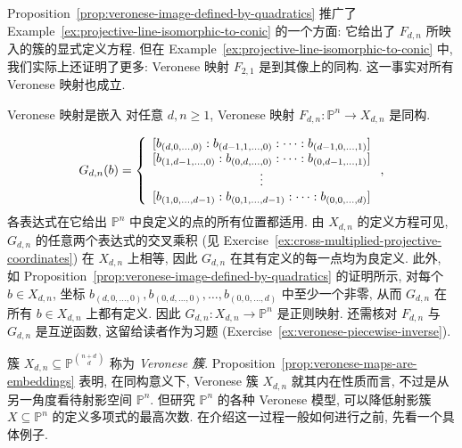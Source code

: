 Proposition~\ref{prop:veronese-image-defined-by-quadratics} 推广了 Example~\ref{ex:projective-line-isomorphic-to-conic} 的一个方面: 它给出了 $F_{d,n}$ 所映入的簇的显式定义方程. 但在 Example~\ref{ex:projective-line-isomorphic-to-conic} 中, 我们实际上还证明了更多: Veronese 映射 $F_{2,1}$ 是到其像上的同构. 这一事实对所有 Veronese 映射也成立.

\begin{Proposition}{Veronese 映射是嵌入}\leavevmode\label{prop:veronese-maps-are-embeddings}
对任意 $d,n\ge1$, Veronese 映射 $F_{d,n}:\mathbb{P}^{n}\to X_{d,n}$ 是同构.
\end{Proposition}
\begin{Proof}
\[
  G_{d,n}(b)=\left\{\begin{array}{l}
  [b_{(d,0,\ldots,0)}:b_{(d-1,1,\ldots,0)}:\cdots:b_{(d-1,0,\ldots,1)}]\\
  {[b_{(1,d-1,\ldots,0)}:b_{(0,d,\ldots,0)}:\cdots:b_{(0,d-1,\ldots,1)}]}\\
  \multicolumn{1}{c}{\vdots}\\
  {[b_{(1,0,\ldots,d-1)}:b_{(0,1,\ldots,d-1)}:\cdots:b_{(0,0,\ldots,d)}]}
  \end{array}\right.,
\]
各表达式在它给出 $\mathbb{P}^{n}$ 中良定义的点的所有位置都适用. 由 $X_{d,n}$ 的定义方程可见, $G_{d,n}$ 的任意两个表达式的交叉乘积 (见 Exercise~\ref{ex:cross-multiplied-projective-coordinates}) 在 $X_{d,n}$ 上相等, 因此 $G_{d,n}$ 在其有定义的每一点均为良定义. 此外, 如 Proposition~\ref{prop:veronese-image-defined-by-quadratics} 的证明所示, 对每个 $b\in X_{d,n}$, 坐标 $b_{(d,0,\ldots,0)},b_{(0,d,\ldots,0)},\ldots,b_{(0,0,\ldots,d)}$ 中至少一个非零, 从而 $G_{d,n}$ 在所有 $b\in X_{d,n}$ 上都有定义. 因此 $G_{d,n}:X_{d,n}\to\mathbb{P}^{n}$ 是正则映射. 还需核对 $F_{d,n}$ 与 $G_{d,n}$ 是互逆函数, 这留给读者作为习题 (Exercise~\ref{ex:veronese-piecewise-inverse}).
\end{Proof}

簇 $X_{d,n}\subseteq\mathbb{P}^{\binom{n+d}{d}}$ 称为 \emph{Veronese 簇}. Proposition~\ref{prop:veronese-maps-are-embeddings} 表明, 在同构意义下, Veronese 簇 $X_{d,n}$ 就其内在性质而言, 不过是从另一角度看待射影空间 $\mathbb{P}^{n}$. 但研究 $\mathbb{P}^{n}$ 的各种 Veronese 模型, 可以降低射影簇 $X\subseteq\mathbb{P}^{n}$ 的定义多项式的最高次数. 在介绍这一过程一般如何进行之前, 先看一个具体例子.

